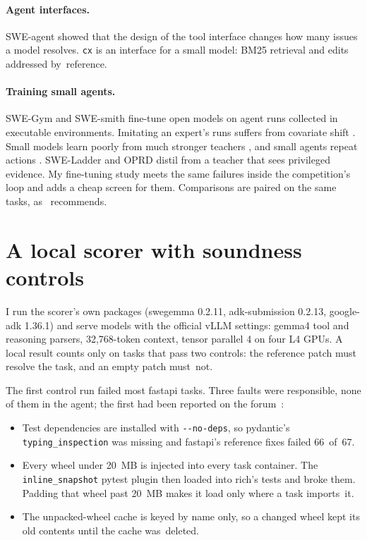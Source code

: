 \paragraph{Agent interfaces.} SWE-agent \citep{sweagent} showed that the design of the tool interface changes how many issues a model resolves. \texttt{cx} is an interface for a small model: BM25 retrieval \citep{bm25} and edits addressed by~reference.

\paragraph{Training small agents.} SWE-Gym \citep{swegym} and SWE-smith \citep{swesmith} fine-tune open models on agent runs collected in executable environments. Imitating an expert's runs suffers from covariate shift \citep{oec}. Small models learn poorly from much stronger teachers \citep{learnability}, and small agents repeat actions \citep{deloop,sweprotege}. SWE-Ladder \citep{sweladder} and OPRD \citep{oprd} distil from a teacher that sees privileged evidence. My fine-tuning study meets the same failures inside the competition's loop and adds a cheap screen for them. Comparisons are paired on the same tasks, as \citet{errorbars}~recommends.


\section{A local scorer with soundness controls}\label{sec:scorer}

I run the scorer's own packages (swegemma 0.2.11, adk-submission 0.2.13, google-adk 1.36.1) and serve models with the official vLLM \citep{vllm} settings: gemma4 tool and reasoning parsers, 32,768-token context, tensor parallel 4 on four L4 GPUs. A local result counts only on tasks that pass two controls: the reference patch must resolve the task, and an empty patch must~not.

The first control run failed most fastapi tasks. Three faults were responsible, none of them in the agent; the first had been reported on the forum~\citep{forumdeps}:

\begin{itemize}
\item Test dependencies are installed with \texttt{-{}-no-deps}, so pydantic's \texttt{typing\_inspection} was missing and fastapi's reference fixes failed 66~of~67.
\item Every wheel under 20~MB is injected into every task container. The \texttt{inline\_snapshot} pytest plugin then loaded into rich's tests and broke them. Padding that wheel past 20~MB makes it load only where a task imports~it.
\item The unpacked-wheel cache is keyed by name only, so a changed wheel kept its old contents until the cache was~deleted.
\end{itemize}

